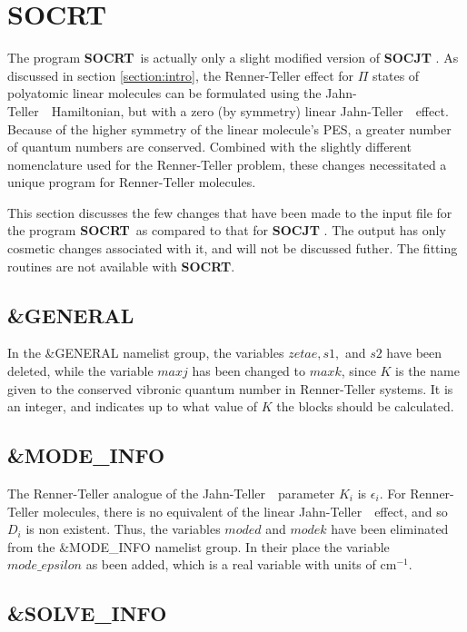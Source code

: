 \documentclass{article}
\newcommand{\wn}{cm$^{-1}$}
\newcommand{\JT}{Jahn-Teller\ }
\newcommand{\socjt}{{\bf SOCJT }}
\newcommand{\socrt}{{\bf SOCRT}}
\begin{document}
\section{\socrt } \label{section:socrt}

The program \socrt\ is actually only a slight modified version of
\socjt . As discussed in section \ref{section:intro}, the
Renner-Teller effect for $\Pi $ states of polyatomic linear molecules
can be formulated using the \JT\ Hamiltonian, but with a zero (by
symmetry) linear \JT\ effect. Because of the higher symmetry of the
linear molecule's PES, a greater number of quantum numbers are
conserved. Combined with the slightly different nomenclature used for
the Renner-Teller problem, these changes necessitated a unique program
for Renner-Teller molecules.

This section discusses the few changes that have been made to the
input file for the program \socrt\ as compared to that for \socjt
. The output has only cosmetic changes associated with it, and will
not be discussed futher. The fitting routines are not available with
\socrt .

\subsection{\&GENERAL}

In the \&GENERAL namelist group, the variables $zetae, s1,$ and $s2$
have been deleted, while the variable $maxj$ has been changed to
$maxk$, since $K$ is the name given to the conserved vibronic quantum
number in Renner-Teller systems. It is an integer, and indicates up to
what value of $K$ the blocks should be calculated.

\subsection{\&MODE\_INFO}

The Renner-Teller analogue of the \JT\ parameter $K_i$ is $\epsilon
_i$. For Renner-Teller molecules, there is no equivalent of the linear
\JT\ effect, and so $D_i$ is non existent. Thus, the variables
$moded$ and $modek$ have been eliminated from the \&MODE\_INFO
namelist group. In their place the variable $mode\_epsilon$ as been
added, which is a real variable with units of \wn .

\subsection{\&SOLVE\_INFO}
\end{document}
